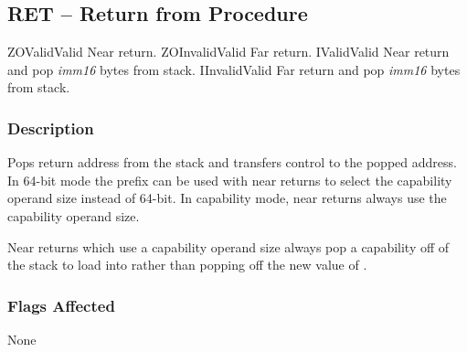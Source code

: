 \clearpage
{}
{}
\subsection*{RET -- Return from Procedure}

\begin{x86opcodetable}
  {ZO}{Valid}{Valid}
  {Near return.}
  {ZO}{Invalid}{Valid}
  {Far return.}
  {I}{Valid}{Valid}
  {Near return and pop \emph{imm16} bytes from stack.}
  {I}{Invalid}{Valid}
  {Far return and pop \emph{imm16} bytes from stack.}
\end{x86opcodetable}

\begin{x86opentable}
\end{x86opentable}

\subsubsection*{Description}

Pops return address from the stack and transfers control to the popped
address.  In 64-bit mode the  prefix can be used with
near returns to select the capability operand size instead of 64-bit.
In capability mode, near returns always use the capability operand
size.

Near returns which use a capability operand size always pop a
capability off of the stack to load into \CIP{} rather than popping
off the new value of \RIP{}.

\subsubsection*{Flags Affected}

None
